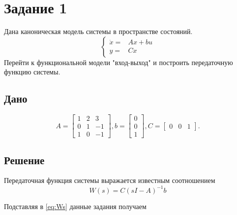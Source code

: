 


    
    \setcounter{page}{2}
    \setlength{\parindent}{0pt}

    \section*{Задание 1}
    Дана каноническая модель системы в пространстве состояний.
    \begin{equation*}
        \left\{
        \begin{aligned}
            \dot{x} =& Ax + bu\\
            y =& Cx
        \end{aligned}
        \right.
    \end{equation*}
    Перейти к функциональной модели "вход-выход" и построить передаточную функцию системы.

    \subsection*{Дано}
    \begin{equation*}
        A =
        \begin{bmatrix}
            1& 2& 3 \\
            0& 1& -1\\
            1& 0& -1
        \end{bmatrix}
        , b =
        \begin{bmatrix}
            0\\
            0\\
            1
        \end{bmatrix}
        , C =
        \begin{bmatrix}
            0& 0& 1
        \end{bmatrix}
        .
    \end{equation*}

    \subsection*{Решение}
    Передаточная функция системы выражается известным соотношением
    \begin{equation}
        \label{eq:Ws}
        W(s) = C(sI - A)^{-1}b
    \end{equation}

    Подставляя в \ref{eq:Ws} данные задания получаем

